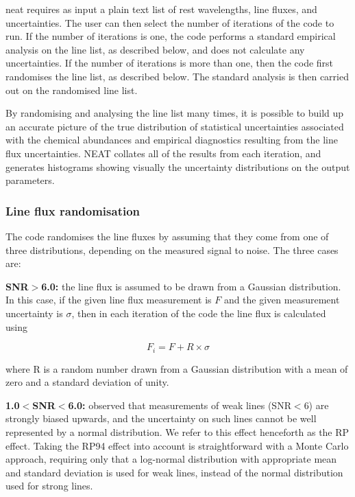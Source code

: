 \documentclass[useAMS,usenatbib]{mn2e}
\begin{document}
{\sc neat} requires as input a plain text list of rest wavelengths, line fluxes, and uncertainties.  The user can then select the number of iterations of the code to run.  If the number of iterations is one, the code performs a standard empirical analysis on the line list, as described below, and does not calculate any uncertainties.  If the number of iterations is more than one, then the code first randomises the line list, as described below.  The standard analysis is then carried out on the randomised line list.

By randomising and analysing the line list many times, it is possible to build up an accurate picture of the true distribution of statistical uncertainties associated with the chemical abundances and empirical diagnostics resulting from the line flux uncertainties. {\sc NEAT} collates all of the results from each iteration, and generates histograms showing visually the uncertainty distributions on the output parameters.

\subsubsection{Line flux randomisation}
\label{randomising}

The code randomises the line fluxes by assuming that they come from one of three distributions, depending on the measured signal to noise.  The three cases are:

{\bf SNR$>$6.0: } the line flux is assumed to be drawn from a Gaussian distribution.  In this case, if the given line flux measurement is $F$ and the given measurement uncertainty is $\sigma$, then in each iteration of the code the line flux is calculated using

\begin{equation}
F_i = F + R\times\sigma
\end{equation}

where R is a random number drawn from a Gaussian distribution with a mean of zero and a standard deviation of unity.

{\bf 1.0$<$SNR$<$6.0: } \citet[][hereafter RP94]{1994A&A...287..676R} observed that measurements of weak lines (SNR$<$6) are strongly biased upwards, and the uncertainty on such lines cannot be well represented by a normal distribution.  We refer to this effect henceforth as the RP effect.  Taking the RP94 effect into account is straightforward with a Monte Carlo approach, requiring only that a log-normal distribution with appropriate mean and standard deviation is used for weak lines, instead of the normal distribution used for strong lines.
\end{document}
